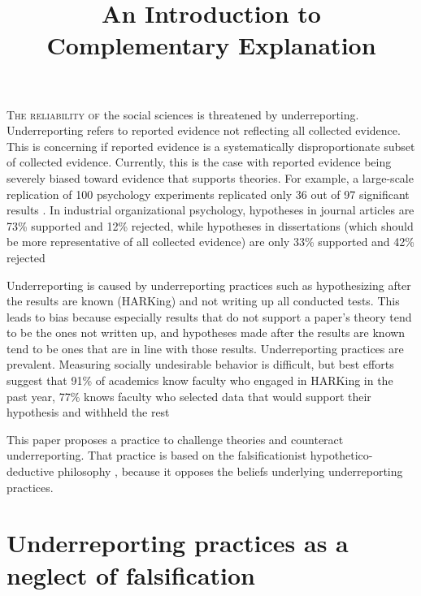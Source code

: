 \documentclass[twocolumn, 10pt]{article}
\title{An Introduction to Complementary Explanation}
\begin{document}
\maketitle
\the\parskip
\lettrine{T}{he reliability of} the social sciences is threatened by underreporting. Underreporting refers to reported evidence not reflecting all collected evidence. This is concerning if reported evidence is a systematically disproportionate subset of collected evidence. Currently, this is the case with reported evidence being severely biased toward evidence that supports theories. For example, a large-scale replication of 100 psychology experiments replicated only 36 out of 97 significant results \parencite{OpenScienceCollaboration2015}.  In industrial organizational psychology, hypotheses in journal articles are 73\% supported and 12\% rejected, while hypotheses in dissertations (which should be more representative of all collected evidence) are only 33\% supported and 42\% rejected \parencite{Mazzola2013, Hugten2021}

Underreporting is caused by underreporting practices such as hypothesizing after the results are known (HARKing) and not writing up all conducted tests. This leads to bias because especially results that do not support a paper's theory tend to be the ones not written up, and hypotheses made after the results are known tend to be ones that are in line with those results. Underreporting practices are prevalent. Measuring socially undesirable behavior is difficult, but best efforts suggest that 91\% of academics know faculty who engaged in HARKing in the past year, 77\% knows faculty who selected data that would support their hypothesis and withheld the rest \parencite{Bedeian2010, Rubin2017}

This paper proposes a practice to challenge theories and counteract underreporting. That practice is based on the falsificationist hypothetico-deductive philosophy \parencite{vanWitteloostuijn2016}, because it opposes the beliefs underlying underreporting practices.



\section{Underreporting practices as a neglect of falsification}
\end{document}
